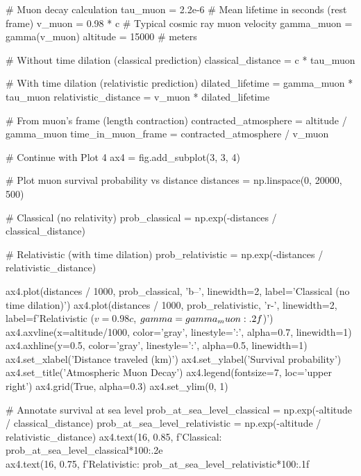 \documentclass[a4paper, 11pt]{article}
\begin{document}
\begin{pycode}
# Muon decay calculation
tau_muon = 2.2e-6  # Mean lifetime in seconds (rest frame)
v_muon = 0.98 * c  # Typical cosmic ray muon velocity
gamma_muon = gamma(v_muon)
altitude = 15000  # meters

# Without time dilation (classical prediction)
classical_distance = c * tau_muon

# With time dilation (relativistic prediction)
dilated_lifetime = gamma_muon * tau_muon
relativistic_distance = v_muon * dilated_lifetime

# From muon's frame (length contraction)
contracted_atmosphere = altitude / gamma_muon
time_in_muon_frame = contracted_atmosphere / v_muon

# Continue with Plot 4
ax4 = fig.add_subplot(3, 3, 4)

# Plot muon survival probability vs distance
distances = np.linspace(0, 20000, 500)

# Classical (no relativity)
prob_classical = np.exp(-distances / classical_distance)

# Relativistic (with time dilation)
prob_relativistic = np.exp(-distances / relativistic_distance)

ax4.plot(distances / 1000, prob_classical, 'b--', linewidth=2,
         label='Classical (no time dilation)')
ax4.plot(distances / 1000, prob_relativistic, 'r-', linewidth=2,
         label=f'Relativistic ($v=0.98c$, $\\gamma={gamma_muon:.2f}$)')
ax4.axvline(x=altitude/1000, color='gray', linestyle=':', alpha=0.7, linewidth=1)
ax4.axhline(y=0.5, color='gray', linestyle=':', alpha=0.5, linewidth=1)
ax4.set_xlabel('Distance traveled (km)')
ax4.set_ylabel('Survival probability')
ax4.set_title('Atmospheric Muon Decay')
ax4.legend(fontsize=7, loc='upper right')
ax4.grid(True, alpha=0.3)
ax4.set_ylim(0, 1)

# Annotate survival at sea level
prob_at_sea_level_classical = np.exp(-altitude / classical_distance)
prob_at_sea_level_relativistic = np.exp(-altitude / relativistic_distance)
ax4.text(16, 0.85, f'Classical: {prob_at_sea_level_classical*100:.2e}\\%
ax4.text(16, 0.75, f'Relativistic: {prob_at_sea_level_relativistic*100:.1f}\\%
\end{pycode}
\end{document}
